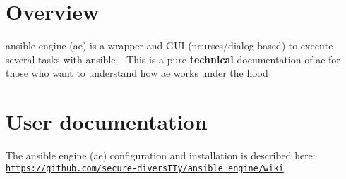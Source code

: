 \hypertarget{index_intro}{}\section{Overview}\label{index_intro}
ansible engine (ae) is a wrapper and G\+UI (ncurses/dialog based) to execute several tasks with ansible.~\newline
 This is a pure {\bfseries technical} documentation of ae for those who want to understand how ae works under the hood\hypertarget{index_secintro}{}\section{User documentation}\label{index_secintro}
The ansible engine (ae) configuration and installation is described here\+: ~\newline
 \href{https://github.com/secure-diversITy/ansible_engine/wiki}{\tt https\+://github.\+com/secure-\/divers\+I\+Ty/ansible\+\_\+engine/wiki} 